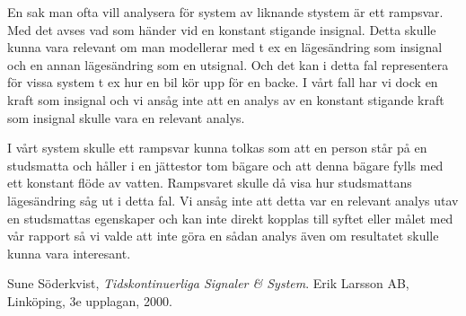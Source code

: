 \documentclass[10pt,a4paper]{article}
\begin{document}
En sak man ofta vill analysera för system av liknande stystem är ett rampsvar. Med det avses vad som händer vid en konstant stigande insignal. Detta skulle kunna vara relevant om man modellerar med t ex en lägesändring som insignal och en annan lägesändring som en utsignal. Och det kan i detta fal representera för vissa system t ex hur en bil kör upp för en backe. I vårt fall har vi dock en kraft som insignal och vi ansåg inte att en analys av en konstant stigande kraft som insignal skulle vara en relevant analys.

I vårt system skulle ett rampsvar kunna tolkas som att en person står på en studsmatta och håller i en jättestor tom bägare och att denna bägare fylls med ett konstant flöde av vatten. Rampsvaret skulle då visa hur studsmattans lägesändring såg ut i detta fal. Vi ansåg inte att detta var en relevant analys utav en studsmattas egenskaper och kan inte direkt kopplas till syftet eller målet med vår rapport så vi valde att inte göra en sådan analys även om resultatet skulle kunna vara interesant.




\newpage

\begin{thebibliography}{9}

  Sune Söderkvist,
  \emph{Tidskontinuerliga Signaler \& System}.
  \linebreak
  Erik Larsson AB, Linköping,
  3e upplagan,
  2000.

\end{thebibliography}
\end{document}
